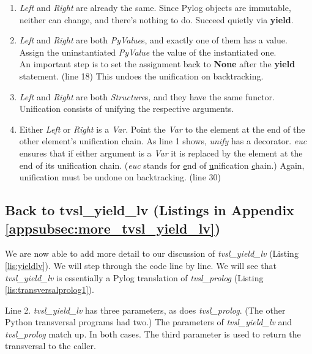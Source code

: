 \begin{enumerate}
    \item \textit{Left} and \textit{Right} are already the same. Since Pylog objects are immutable, neither can change, and there's nothing to do. Succeed quietly via \textbf{yield}.

    \item \textit{Left} and \textit{Right} are both \textit{PyValue}s, and exactly one of them has a value. Assign the uninstantiated \textit{PyValue} the value of the instantiated one.
    \smallv \\
    An important step is to set the assignment back to \textbf{None} after the \textbf{yield} statement. (line 18) This undoes the unification on backtracking.

    \item \textit{Left} and \textit{Right} are both \textit{Structure}s, and they have the same functor. Unification consists of unifying the respective arguments. 

    \item Either \textit{Left} or \textit{Right} is a \textit{Var}. Point the \textit{Var} to the  element at the end of the other element's unification chain. As line 1 shows, \textit{unify} has a decorator. \textit{euc} ensures that if either argument is a \textit{Var} it is replaced by the element at the end of its unification chain. (\textit{euc} stands for \underline{e}nd of \underline{u}nification \underline{c}hain.) Again, unification must be undone on backtracking. (line 30) 

\end{enumerate} 

\subsection{Back to tvsl\_yield\_lv (Listings in Appendix \ref{appsubsec:more_tvsl_yield_lv})} \label{subsec:more_tvsl_yield_lv}

We are now able to add more detail to our discussion of \textit{tvsl\_yield\_lv} (Listing \ref{lis:yieldlv}). We will step through the code line by line. We will see that \textit{tvsl\_yield\_lv} is essentially a Pylog translation of  \textit{tvsl\_prolog} (Listing \ref{lis:transversalprolog1}).

Line 2. \textit{tvsl\_yield\_lv} has three parameters, as does \textit{tvsl\_prolog}. (The other Python transversal programs had two.) The parameters of  \textit{tvsl\_yield\_lv} and \textit{tvsl\_prolog} match up. In both cases. The third parameter is used to return the transversal to the caller.

